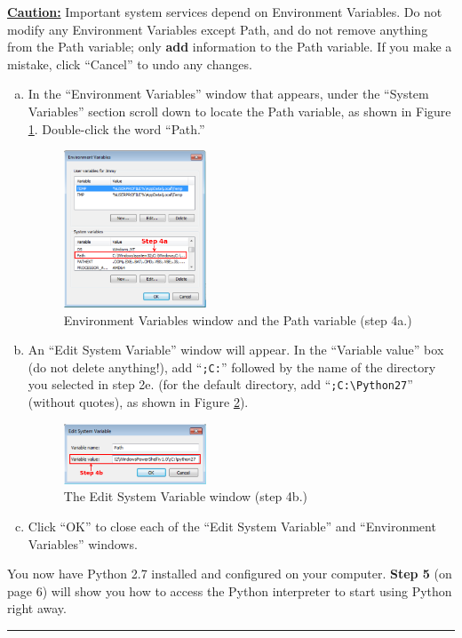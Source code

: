 \documentclass[11pt,english]{article}
\newcommand{\myhrule}{\vspace{0.3cm}\hrule\vspace{0.3cm}}
\begin{document}
{\bf \color{red} \underline{Caution:}} Important system services depend on
Environment Variables. Do not modify any Environment Variables
except Path, and do not remove anything from the Path variable; only {\bf add}
information to the Path variable. If you make a mistake, click ``Cancel'' to
undo any changes.

\begin{enumerate}[a.]
\item In the ``Environment Variables'' window that appears, under the ``System
Variables'' section scroll down to locate the Path variable, as shown in Figure
\ref{fig:dia7}. Double-click the word ``Path.''
\begin{figure}[h]
\begin{center}
\includegraphics[width=0.4\textwidth]{dia7}
\end{center}
\vspace{-0.5cm}
\caption{Environment Variables window and the Path variable (step 4a.)}
\label{fig:dia7}
\end{figure}
\item An ``Edit System Variable'' window will appear. In the ``Variable value''
box (do not delete anything!), add ``\texttt{;C:}'' followed by the name of the
directory you selected in step 2e. (for the default directory, add
``\texttt{;C:\textbackslash Python27}'' (without quotes), as shown in Figure
\ref{fig:dia8}).
\begin{figure}[h]
\begin{center}
\includegraphics[width=0.4\textwidth]{dia8}
\end{center}
\vspace{-0.5cm}
\caption{The Edit System Variable window (step 4b.)}
\label{fig:dia8}
\end{figure}
\item Click ``OK'' to close each of the ``Edit System Variable'' and
``Environment Variables'' windows.
\end{enumerate}
\vfill
You now have Python 2.7 installed and configured on your computer. {\bf Step 5}
(on page 6) will show you how to access the Python interpreter to start using
Python right away.
\myhrule
\end{document}
